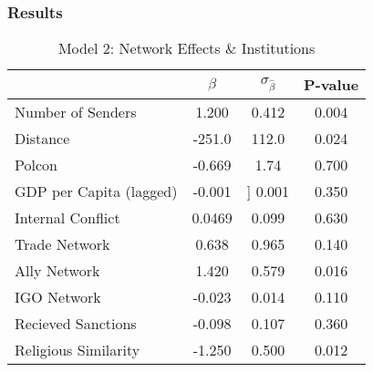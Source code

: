 \documentclass{beamer}
\begin{document}
\begin{frame}
\frametitle{Results}

\begin{table}
\caption{Model 2: Network Effects & Institutions}
\begin{tabular}{lccc}
\hline
& $\beta$ & $\sigma_{\hat{\beta}}$ & P-value \\
\hline
Number of Senders &  1.200 & 0.412 & 0.004 \\ 
Distance & -251.0 & 112.0 & 0.024 \\
Polcon & -0.669 &  1.74 & 0.700 \\
GDP per Capita (lagged) & -0.001 & ] 0.001 &  0.350 \\
Internal Conflict & 0.0469 & 0.099 & 0.630 \\
Trade Network & 0.638 & 0.965 & 0.140 \\
Ally Network & 1.420 & 0.579 & 0.016 \\
IGO Network &  -0.023 & 0.014 & 0.110 \\
Recieved Sanctions & -0.098 & 0.107 & 0.360 \\
Religious Similarity &  -1.250 & 0.500  & 0.012 \\
\hline
\end{tabular}
\end{table}

\end{frame}
\end{document}
